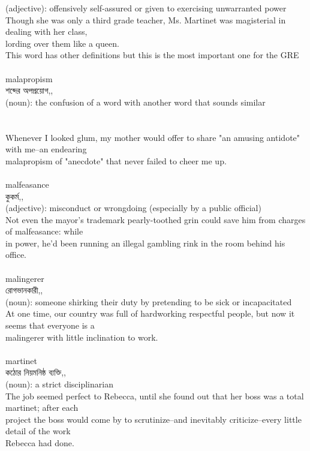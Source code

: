 \documentclass{article}
\begin{document}
{{(adjective): offensively self-assured or given to exercising unwarranted power\\Though she was only a third grade teacher, Ms. Martinet was magisterial in dealing with her class,\\lording over them like a queen.\\This word has other definitions but this is the most important one for the GRE\\}\\
{malapropism}\\
{শব্দের অপপ্রয়োগ,,}\\
{(noun): the confusion of a word with another word that sounds similar\\\\                                                                               \\Whenever I looked glum, my mother would offer to share "an amusing antidote" with me--an endearing\\malapropism of "anecdote" that never failed to cheer me up.\\}\\
{malfeasance}\\
{কুকর্ম,,}\\
{(adjective): misconduct or wrongdoing (especially by a public official)\\Not even the mayor's trademark pearly-toothed grin could save him from charges of malfeasance: while\\in power, he'd been running an illegal gambling rink in the room behind his office.\\}\\
{malingerer}\\
{রোগভানকারী,,}\\
{(noun): someone shirking their duty by pretending to be sick or incapacitated\\At one time, our country was full of hardworking respectful people, but now it seems that everyone is a\\malingerer with little inclination to work.\\}\\
{martinet}\\
{কঠোর নিয়মনিষ্ঠ ব্যক্তি,,}\\
{(noun): a strict disciplinarian\\The job seemed perfect to Rebecca, until she found out that her boss was a total martinet; after each\\project the boss would come by to scrutinize--and inevitably criticize--every little detail of the work\\Rebecca had done.\\}\\
}
\end{document}
